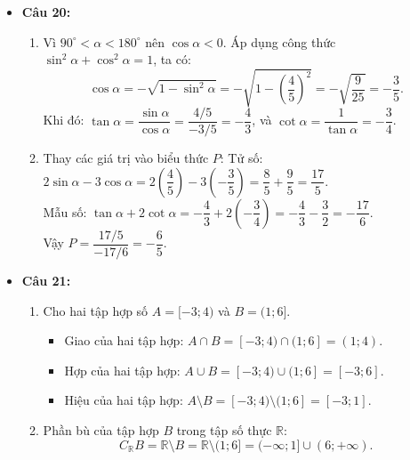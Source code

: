 \documentclass[12pt,a4paper]{article}
\begin{document}
\begin{itemize}[leftmargin=0.6cm, itemsep=1.5pt, topsep=1pt]
    \item \textbf{Câu 20:}
    \begin{enumerate}[label=\alph*), itemsep=0.5pt]
        \item Vì $90^\circ < \alpha < 180^\circ$ nên $\cos \alpha < 0$. Áp dụng công thức $\sin^2 \alpha + \cos^2 \alpha = 1$, ta có:
        \[
        \cos \alpha = -\sqrt{1 - \sin^2 \alpha} = -\sqrt{1 - \left(\dfrac{4}{5}\right)^2} = -\sqrt{\dfrac{9}{25}} = -\dfrac{3}{5}.
        \]
        Khi đó: $\tan \alpha = \dfrac{\sin \alpha}{\cos \alpha} = \dfrac{4/5}{-3/5} = -\dfrac{4}{3}$, và $\cot \alpha = \dfrac{1}{\tan \alpha} = -\dfrac{3}{4}$.
        \item Thay các giá trị vào biểu thức $P$:
        Tử số: $2\sin \alpha - 3\cos \alpha = 2\left(\dfrac{4}{5}\right) - 3\left(-\dfrac{3}{5}\right) = \dfrac{8}{5} + \dfrac{9}{5} = \dfrac{17}{5}$.\\
        Mẫu số: $\tan \alpha + 2\cot \alpha = -\dfrac{4}{3} + 2\left(-\dfrac{3}{4}\right) = -\dfrac{4}{3} - \dfrac{3}{2} = -\dfrac{17}{6}$.\\
        Vậy $P = \dfrac{17/5}{-17/6} = -\dfrac{6}{5}$.
    \end{enumerate}

    \item \textbf{Câu 21:}
    \begin{enumerate}[label=\alph*), itemsep=0.5pt]
        \item Cho hai tập hợp số $A = [-3; 4)$ và $B = (1; 6]$.
        \begin{itemize}[itemsep=0.5pt]
            \item Giao của hai tập hợp: $A \cap B = [-3; 4) \cap (1; 6] = (1; 4)$.
            \item Hợp của hai tập hợp: $A \cup B = [-3; 4) \cup (1; 6] = [-3; 6]$.
            \item Hiệu của hai tập hợp: $A \setminus B = [-3; 4) \setminus (1; 6] = [-3; 1]$.
        \end{itemize}
        \item Phần bù của tập hợp $B$ trong tập số thực $\mathbb{R}$:
        \[
        C_{\mathbb{R}} B = \mathbb{R} \setminus B = \mathbb{R} \setminus (1; 6] = (-\infty; 1] \cup (6; +\infty).
        \]
    \end{enumerate}


\end{itemize}
\end{document}
